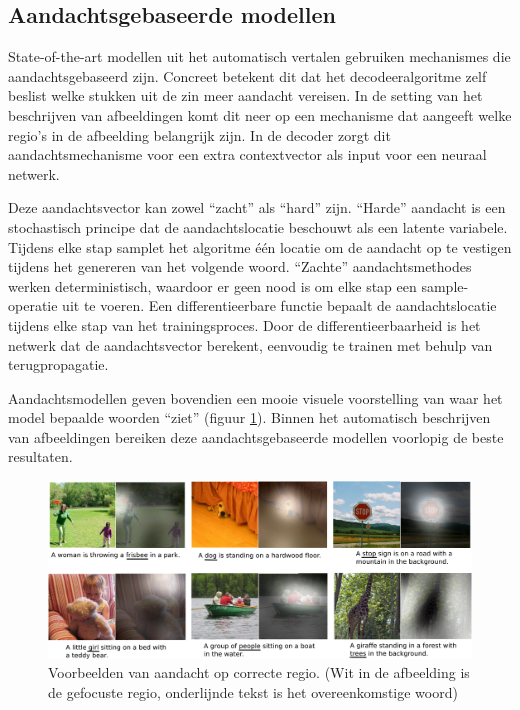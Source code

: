 \subsection{Aandachtsgebaseerde modellen}
State-of-the-art modellen uit het automatisch vertalen gebruiken mechanismes die aandachtsgebaseerd zijn. Concreet betekent dit dat het decodeeralgoritme zelf beslist welke stukken uit de zin meer aandacht vereisen.
In de setting van het beschrijven van afbeeldingen komt dit neer op een mechanisme dat aangeeft welke regio's in de afbeelding belangrijk zijn. In de decoder zorgt dit aandachtsmechanisme voor een extra contextvector als input voor een neuraal netwerk. 

Deze aandachtsvector kan zowel ``zacht'' als ``hard'' zijn. ``Harde'' aandacht is een stochastisch principe dat de aandachtslocatie beschouwt als een latente variabele. Tijdens elke stap samplet het algoritme \'e\'en locatie om de aandacht op te vestigen tijdens het genereren van het volgende woord. ``Zachte'' aandachtsmethodes werken deterministisch, waardoor er geen nood is om elke stap een sample-operatie uit te voeren. Een differentieerbare functie bepaalt de aandachtslocatie tijdens elke stap van het trainingsproces. Door de differentieerbaarheid is het netwerk dat de aandachtsvector berekent, eenvoudig te trainen met behulp van terugpropagatie.

Aandachtsmodellen geven bovendien een mooie visuele voorstelling van waar het model bepaalde woorden ``ziet'' (figuur \ref{fig:attention-example}). Binnen het automatisch beschrijven van afbeeldingen bereiken deze aandachtsgebaseerde modellen voorlopig de beste resultaten\cite{Jin2015,Xu2015}.

\begin{figure}[tb]
	\centering
	\includegraphics[width=\linewidth]{Images/good_Xu.pdf}
	\caption[Voorbeelden van aandacht op correcte regio.]{Voorbeelden van aandacht op correcte regio. (Wit in de afbeelding is de gefocuste regio, onderlijnde tekst is het overeenkomstige woord)\cite{Xu2015}}
	\label{fig:attention-example}
\end{figure}

